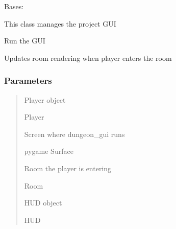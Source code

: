\documentclass[letterpaper,10pt,english]{sphinxmanual}
\begin{document}
\begin{fulllineitems}
\label{\detokenize{api_reference/dungeon_resolver/GUI:GUI.GUI}}
\pysigstartsignatures
{}
\pysigstopsignatures
\sphinxAtStartPar
Bases: 

\sphinxAtStartPar
This class manages the project GUI

\begin{fulllineitems}
\label{\detokenize{api_reference/dungeon_resolver/GUI:GUI.GUI.run}}
\pysigstartsignatures
{}
\pysigstopsignatures
\sphinxAtStartPar
Run the GUI

\end{fulllineitems}


\end{fulllineitems}


\begin{fulllineitems}
\label{\detokenize{api_reference/dungeon_resolver/GUI:GUI.enter_room}}
\pysigstartsignatures
{}
\pysigstopsignatures
\sphinxAtStartPar
Updates room rendering when player enters the room


\subsubsection{Parameters}
\label{\detokenize{api_reference/dungeon_resolver/GUI:parameters}}\begin{quote}\begin{description}
\sphinxAtStartPar
Player object

\sphinxAtStartPar
Player

\sphinxAtStartPar
Screen where dungeon\_gui runs

\sphinxAtStartPar
pygame Surface

\sphinxAtStartPar
Room the player is entering

\sphinxAtStartPar
Room

\sphinxAtStartPar
HUD object

\sphinxAtStartPar
HUD

\end{description}\end{quote}

\end{fulllineitems}
\end{document}
